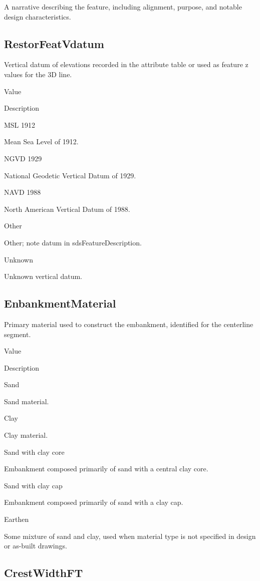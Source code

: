 \documentclass[
  letterpaper,
  DIV=11,
  numbers=noendperiod]{scrreprt}
\begin{document}
A narrative describing the feature, including alignment, purpose, and
notable design characteristics.

\subsection{RestorFeatVdatum}\label{restorfeatvdatum-2}

Vertical datum of elevations recorded in the attribute table or used as
feature z values for the 3D line.

Value

Description

MSL 1912

Mean Sea Level of 1912.

NGVD 1929

National Geodetic Vertical Datum of 1929.

NAVD 1988

North American Vertical Datum of 1988.

Other

Other; note datum in sdsFeatureDescription.

Unknown

Unknown vertical datum.

\subsection{EnbankmentMaterial}\label{enbankmentmaterial-1}

Primary material used to construct the embankment, identified for the
centerline segment.

Value

Description

Sand

Sand material.

Clay

Clay material.

Sand with clay core

Embankment composed primarily of sand with a central clay core.

Sand with clay cap

Embankment composed primarily of sand with a clay cap.

Earthen

Some mixture of sand and clay, used when material type is not specified
in design or as-built drawings.

\subsection{CrestWidthFT}\label{crestwidthft-1}
\end{document}
